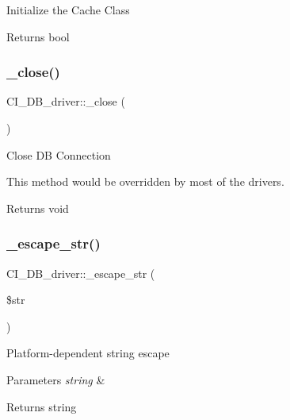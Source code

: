 Initialize the Cache Class

\begin{DoxyReturn}{Returns}
bool 
\end{DoxyReturn}
\mbox{\label{class_c_i___d_b__driver_a0370680f39cad691e120d02f0a71a891}} 
\subsubsection{\texorpdfstring{\+\_\+close()}{\_close()}}
{\footnotesize\ttfamily C\+I\+\_\+\+D\+B\+\_\+driver\+::\+\_\+close (\begin{DoxyParamCaption}{ }\end{DoxyParamCaption})\hspace{0.3cm}{\ttfamily [protected]}}

Close DB Connection

This method would be overridden by most of the drivers.

\begin{DoxyReturn}{Returns}
void 
\end{DoxyReturn}
\mbox{\label{class_c_i___d_b__driver_ac08e8602594cd0aa8dd82cfcb30fe515}} 
\subsubsection{\texorpdfstring{\+\_\+escape\+\_\+str()}{\_escape\_str()}}
{\footnotesize\ttfamily C\+I\+\_\+\+D\+B\+\_\+driver\+::\+\_\+escape\+\_\+str (\begin{DoxyParamCaption}\item[{}]{\$str }\end{DoxyParamCaption})\hspace{0.3cm}{\ttfamily [protected]}}

Platform-\/dependent string escape


\begin{DoxyParams}{Parameters}
{\em string} & \\
\hline
\end{DoxyParams}
\begin{DoxyReturn}{Returns}
string 
\end{DoxyReturn}
\mbox{\label{class_c_i___d_b__driver_a9a2926482fa1b2cdd5e546fafa4c8ae2}} 

